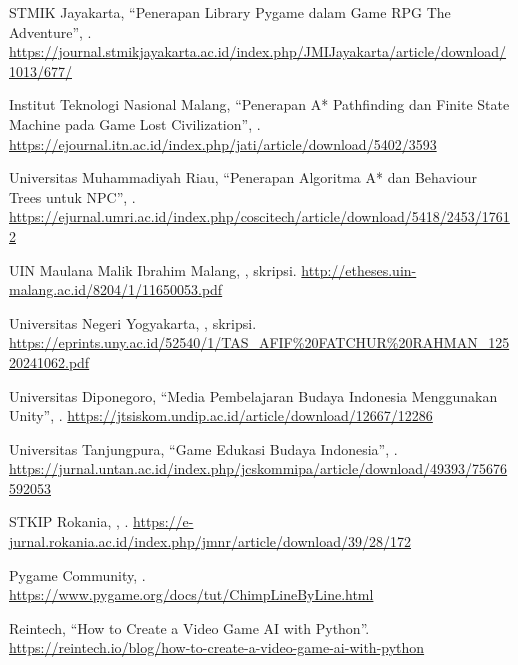 \begin{sloppypar}
\begin{enumerate}[label={[R\arabic*]}, leftmargin=3.2em, itemsep=4pt, topsep=4pt, start=15]
  \item STMIK Jayakarta, ``Penerapan Library Pygame dalam Game RPG The
        Adventure'', .
        \url{https://journal.stmikjayakarta.ac.id/index.php/JMIJayakarta/article/download/1013/677/}

  \item Institut Teknologi Nasional Malang, ``Penerapan A* Pathfinding dan
        Finite State Machine pada Game Lost Civilization'', .
        \url{https://ejournal.itn.ac.id/index.php/jati/article/download/5402/3593}

  \item Universitas Muhammadiyah Riau, ``Penerapan Algoritma A* dan Behaviour
        Trees untuk NPC'', .
        \url{https://ejurnal.umri.ac.id/index.php/coscitech/article/download/5418/2453/17612}

  \item UIN Maulana Malik Ibrahim Malang, , skripsi.
        \url{http://etheses.uin-malang.ac.id/8204/1/11650053.pdf}

  \item Universitas Negeri Yogyakarta, , skripsi.
        \url{https://eprints.uny.ac.id/52540/1/TAS_AFIF%20FATCHUR%20RAHMAN_12520241062.pdf}

  \item Universitas Diponegoro, ``Media Pembelajaran Budaya Indonesia
        Menggunakan Unity'', .
        \url{https://jtsiskom.undip.ac.id/article/download/12667/12286}

  \item Universitas Tanjungpura, ``Game Edukasi Budaya Indonesia'',
        .
        \url{https://jurnal.untan.ac.id/index.php/jcskommipa/article/download/49393/75676592053}

  \item STKIP Rokania, ,
        .
        \url{https://e-jurnal.rokania.ac.id/index.php/jmnr/article/download/39/28/172}

  \item Pygame Community, .
        \url{https://www.pygame.org/docs/tut/ChimpLineByLine.html}

  \item Reintech, ``How to Create a Video Game AI with Python''.
        \url{https://reintech.io/blog/how-to-create-a-video-game-ai-with-python}


\end{enumerate}
\end{sloppypar}
